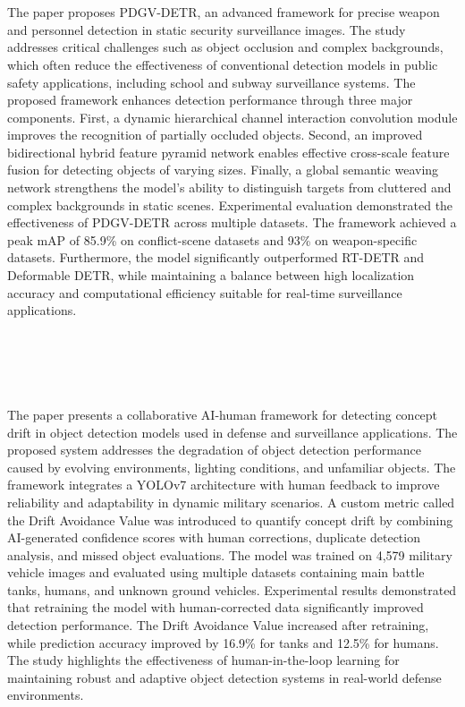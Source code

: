 \section[\LitTitleThree]{\LitTitleThree~\textbf{\cite{supplementary_paper_3}} \label{sec:supplementary_paper_3}}
The paper proposes PDGV-DETR, an advanced framework for precise weapon and personnel detection in static security surveillance images. The study addresses critical challenges such as object occlusion and complex backgrounds, which often reduce the effectiveness of conventional detection models in public safety applications, including school and subway surveillance systems. The proposed framework enhances detection performance through three major components. First, a dynamic hierarchical channel interaction convolution module improves the recognition of partially occluded objects. Second, an improved bidirectional hybrid feature pyramid network enables effective cross-scale feature fusion for detecting objects of varying sizes. Finally, a global semantic weaving network strengthens the model’s ability to distinguish targets from cluttered and complex backgrounds in static scenes. Experimental evaluation demonstrated the effectiveness of PDGV-DETR across multiple datasets. The framework achieved a peak mAP of 85.9\% on conflict-scene datasets and 93\% on weapon-specific datasets. Furthermore, the model significantly outperformed RT-DETR and Deformable DETR, while maintaining a balance between high localization accuracy and computational efficiency suitable for real-time surveillance applications.\label{end:supplementary_paper_3} \\

\section[\LitTitleFour]{\LitTitleFour~\textbf{\cite{supplementary_paper_4}} \label{sec:supplementary_paper_4}}
The paper presents a collaborative AI-human framework for detecting concept drift in object detection models used in defense and surveillance applications. The proposed system addresses the degradation of object detection performance caused by evolving environments, lighting conditions, and unfamiliar objects. The framework integrates a YOLOv7 architecture with human feedback to improve reliability and adaptability in dynamic military scenarios. A custom metric called the Drift Avoidance Value was introduced to quantify concept drift by combining AI-generated confidence scores with human corrections, duplicate detection analysis, and missed object evaluations. The model was trained on 4,579 military vehicle images and evaluated using multiple datasets containing main battle tanks, humans, and unknown ground vehicles. Experimental results demonstrated that retraining the model with human-corrected data significantly improved detection performance. The Drift Avoidance Value increased after retraining, while prediction accuracy improved by 16.9\% for tanks and 12.5\% for humans. The study highlights the effectiveness of human-in-the-loop learning for maintaining robust and adaptive object detection systems in real-world defense environments.\label{end:supplementary_paper_4} \\

